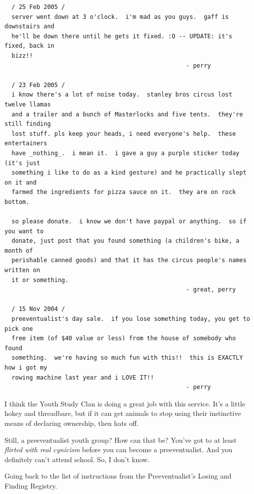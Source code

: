 \documentclass[10pt,twoside]{report}
\begin{document}
\begin{lstlisting}
  / 25 Feb 2005 /
  server went down at 3 o'clock.  i'm mad as you guys.  gaff is downstairs and
  he'll be down there until he gets it fixed. :O -- UPDATE: it's fixed, back in
  bizz!!
                                                   - perry

  / 23 Feb 2005 /
  i know there's a lot of noise today.  stanley bros circus lost twelve llamas
  and a trailer and a bunch of Masterlocks and five tents.  they're still finding
  lost stuff. pls keep your heads, i need everyone's help.  these entertainers
  have _nothing_.  i mean it.  i gave a guy a purple sticker today (it's just
  something i like to do as a kind gesture) and he practically slept on it and
  farmed the ingredients for pizza sauce on it.  they are on rock bottom.

  so please donate.  i know we don't have paypal or anything.  so if you want to
  donate, just post that you found something (a children's bike, a month of
  perishable canned goods) and that it has the circus people's names written on
  it or something.
                                                   - great, perry

  / 15 Nov 2004 /
  preeventualist's day sale.  if you lose something today, you get to pick one
  free item (of $40 value or less) from the house of somebody who found
  something.  we're having so much fun with this!!  this is EXACTLY how i got my
  rowing machine last year and i LOVE IT!!
                                                   - perry

\end{lstlisting}


I think the Youth Study Clan is doing a great job with this service.
It's a little hokey and threadbare, but if it can get animals to stop
using their instinctive means of declaring ownership, then hats off.

Still, a preeventualist youth group?  How can that be?  You've got to
at least {\em flirted with real cynicism} before you can become a
preeventualist.  And you definitely can't attend school. So, I don't
know.

Going back to the list of instructions from the Preeventualist's
Losing and Finding Registry.
\end{document}
